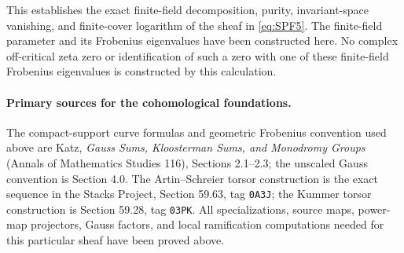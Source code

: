 This establishes the exact finite-field decomposition,
purity, invariant-space vanishing, and finite-cover
logarithm of the sheaf in \eqref{eq:SPF5}. The finite-field
parameter and its Frobenius eigenvalues have been
constructed here. No complex off-critical zeta zero or
identification of such a zero with one of these finite-field
Frobenius eigenvalues is constructed by this calculation.

\paragraph{Primary sources for the cohomological foundations.}
The compact-support curve formulas and geometric Frobenius
convention used above are Katz,
\emph{Gauss Sums, Kloosterman Sums, and Monodromy Groups}
(Annals of Mathematics Studies 116), Sections 2.1--2.3;
the unscaled Gauss convention is Section 4.0.
The Artin--Schreier torsor construction is the exact
sequence in the Stacks Project, Section 59.63, tag
\texttt{0A3J}; the Kummer torsor construction is Section
59.28, tag \texttt{03PK}.
All specializations, source maps, power-map projectors,
Gauss factors, and local ramification computations needed
for this particular sheaf have been proved above.
